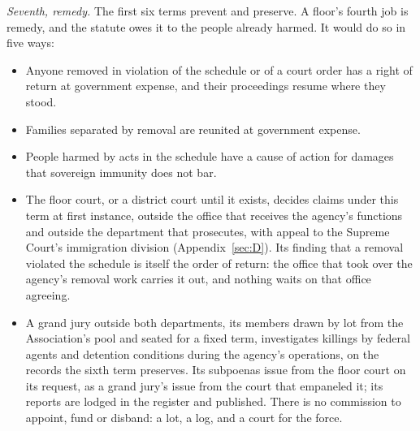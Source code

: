 \emph{Seventh, remedy.} The first six terms prevent and preserve. A floor's fourth job is remedy, and the statute owes it to the people already harmed. It would do so in five ways:

\begin{itemize}
\item Anyone removed in violation of the schedule or of a court order has a right of return at government expense, and their proceedings resume where they stood.
\item Families separated by removal are reunited at government expense.
\item People harmed by acts in the schedule have a cause of action for damages that sovereign immunity does not bar.
\item The floor court, or a district court until it exists, decides claims under this term at first instance, outside the office that receives the agency's functions and outside the department that prosecutes, with appeal to the Supreme Court's immigration division (Appendix~\ref{sec:D}). Its finding that a removal violated the schedule is itself the order of return: the office that took over the agency's removal work carries it out, and nothing waits on that office agreeing.
\item A grand jury outside both departments, its members drawn by lot from the Association's pool and seated for a fixed term, investigates killings by federal agents and detention conditions during the agency's operations, on the records the sixth term preserves. Its subpoenas issue from the floor court on its request, as a grand jury's issue from the court that empaneled it; its reports are lodged in the register and published. There is no commission to appoint, fund or disband: a lot, a log, and a court for the force.
\end{itemize}

